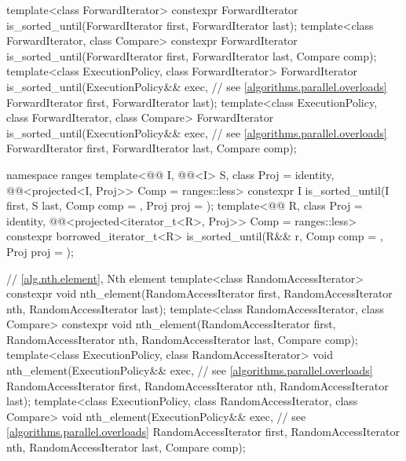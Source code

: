 \begin{codeblock}
{  template<class ForwardIterator>
    constexpr ForwardIterator
      is_sorted_until(ForwardIterator first, ForwardIterator last);
  template<class ForwardIterator, class Compare>
    constexpr ForwardIterator
      is_sorted_until(ForwardIterator first, ForwardIterator last,
                      Compare comp);
  template<class ExecutionPolicy, class ForwardIterator>
    ForwardIterator
      is_sorted_until(ExecutionPolicy&& exec,                   // see \ref{algorithms.parallel.overloads}
                      ForwardIterator first, ForwardIterator last);
  template<class ExecutionPolicy, class ForwardIterator, class Compare>
    ForwardIterator
      is_sorted_until(ExecutionPolicy&& exec,                   // see \ref{algorithms.parallel.overloads}
                      ForwardIterator first, ForwardIterator last,
                      Compare comp);

  namespace ranges {
    template<@@ I, @@<I> S, class Proj = identity,
             @@<projected<I, Proj>> Comp = ranges::less>
      constexpr I is_sorted_until(I first, S last, Comp comp = {}, Proj proj = {});
    template<@@ R, class Proj = identity,
             @@<projected<iterator_t<R>, Proj>> Comp = ranges::less>
      constexpr borrowed_iterator_t<R>
        is_sorted_until(R&& r, Comp comp = {}, Proj proj = {});
  }

  // \ref{alg.nth.element}, Nth element
  template<class RandomAccessIterator>
    constexpr void nth_element(RandomAccessIterator first, RandomAccessIterator nth,
                               RandomAccessIterator last);
  template<class RandomAccessIterator, class Compare>
    constexpr void nth_element(RandomAccessIterator first, RandomAccessIterator nth,
                               RandomAccessIterator last, Compare comp);
  template<class ExecutionPolicy, class RandomAccessIterator>
    void nth_element(ExecutionPolicy&& exec,                    // see \ref{algorithms.parallel.overloads}
                     RandomAccessIterator first, RandomAccessIterator nth,
                     RandomAccessIterator last);
  template<class ExecutionPolicy, class RandomAccessIterator, class Compare>
    void nth_element(ExecutionPolicy&& exec,                    // see \ref{algorithms.parallel.overloads}
                     RandomAccessIterator first, RandomAccessIterator nth,
                     RandomAccessIterator last, Compare comp);

}
\end{codeblock}
